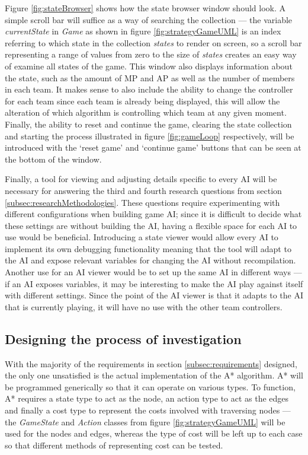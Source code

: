 \documentclass[11pt, a4paper]{report}
\begin{document}
Figure \ref{fig:stateBrowser} shows how the state browser window should look. A simple scroll bar will suffice as a way of searching the collection --- the variable \emph{currentState} in \emph{Game} as shown in figure \ref{fig:strategyGameUML} is an index referring to which state in the collection \emph{states} to render on screen, so a scroll bar representing a range of values from zero to the size of \emph{states} creates an easy way of examine all states of the game. This window also displays information about the state, such as the amount of MP and AP as well as the number of members in each team. It makes sense to also include the ability to change the controller for each team since each team is already being displayed, this will allow the alteration of which algorithm is controlling which team at any given moment. Finally, the ability to reset and continue the game, clearing the state collection and starting the process illustrated in figure \ref{fig:gameLoop} respectively, will be introduced with the `reset game' and `continue game' buttons that can be seen at the bottom of the window. 

Finally, a tool for viewing and adjusting details specific to every AI will be necessary for answering the third and fourth research questions from section \ref{subsec:researchMethodologies}. These questions require experimenting with different configurations when building game AI; since it is difficult to decide what these settings are without building the AI, having a flexible space for each AI to use would be beneficial. Introducing a state viewer would allow every AI to implement its own debugging functionality meaning that the tool will adapt to the AI and expose relevant variables for changing the AI without recompilation. Another use for an AI viewer would be to set up the same AI in different ways --- if an AI exposes variables, it may be interesting to make the AI play against itself with different settings. Since the point of the AI viewer is that it adapts to the AI that is currently playing, it will have no use with the other team controllers.

\pagebreak
\subsection{Designing the process of investigation}
\label{subsec:designingInvestigation process}

With the majority of the requirements in section \ref{subsec:requirements} designed, the only one unsatisfied is the actual implementation of the A* algorithm. A* will be programmed generically so that it can operate on various types. To function, A* requires a state type to act as the node, an action type to act as the edges and finally a cost type to represent the costs involved with traversing nodes --- the \emph{GameState} and \emph{Action} classes from figure \ref{fig:strategyGameUML} will be used for the nodes and edges, whereas the type of cost will be left up to each case so that different methods of representing cost can be tested.
\end{document}
